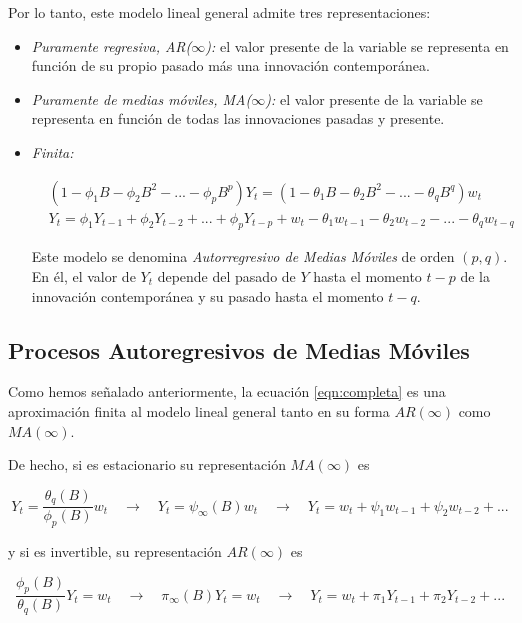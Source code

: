 \documentclass[a4paper,10pt]{article}
\begin{document}
Por lo tanto, este modelo lineal general admite tres representaciones:

\begin{itemize}
 \item \textit{Puramente regresiva, AR($\infty$):} el valor presente de la variable se representa en función de su propio pasado más una innovación contemporánea.

 \item \textit{Puramente de medias móviles, MA($\infty$):} el valor presente de la variable se representa en función de todas las innovaciones pasadas y presente.

 \item \textit{Finita:}

 \begin{equation}\label{eqn:completa}
 \begin{split}
 &(1-\phi_1B - \phi_2B^2 - ... - \phi_pB^p) Y_t = (1-\theta_1B - \theta_2B^2 - ... - \theta_qB^q) w_t \\
 &Y_t = \phi_1Y_{t-1} + \phi_2Y_{t-2} + ... + \phi_pY_{t-p} + w_t -\theta_1w_{t-1} - \theta_2w_{t-2} - ... - \theta_qw_{t-q}
 \end{split}
 \end{equation}

 Este modelo se denomina \textit{Autorregresivo de Medias Móviles} de orden $(p,q)$. En él, el valor de $Y_t$ depende del pasado de $Y$ hasta el momento $t-p$ de la innovación contemporánea y su pasado hasta el momento $t-q$.
\end{itemize}

\subsection{Procesos Autoregresivos de Medias Móviles}

Como hemos señalado anteriormente, la ecuación \ref{eqn:completa} es una aproximación finita al modelo lineal general tanto en su forma $AR(\infty)$ como $MA(\infty)$.

De hecho, si es estacionario su representación $MA(\infty)$ es

\begin{equation}
Y_t = \frac{\theta_q(B)}{\phi_p(B)} w_t \quad \to \quad Y_t = \psi_\infty(B) w_t \quad \to \quad Y_t = w_t + \psi_1 w_{t-1} + \psi_2 w_{t-2} + ...
\end{equation}

y si es invertible, su representación $AR(\infty)$ es

\begin{equation}
\frac{\phi_p(B)}{\theta_q(B)} Y_t = w_t \quad \to \quad \pi_\infty(B) Y_t = w_t \quad \to \quad Y_t = w_t + \pi_1 Y_{t-1} + \pi_2 Y_{t-2} + ...
\end{equation}
\end{document}
